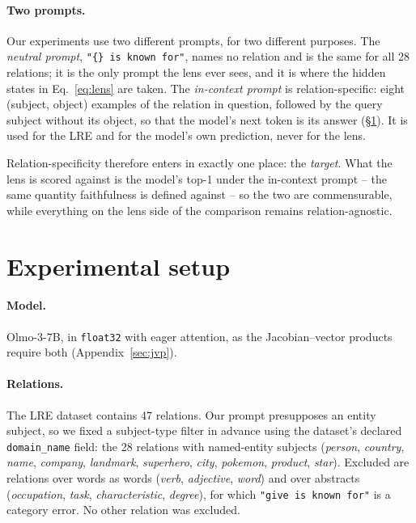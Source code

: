 \documentclass[11pt]{article}
\begin{document}
\paragraph{Two prompts.} Our experiments
use two different prompts, for two different purposes. The
\emph{neutral prompt}, \texttt{"\{\} is known for"}, names no relation and
is the same for all 28 relations; it is the only prompt the lens ever
sees, and it is where the hidden states in Eq.~\ref{eq:lens} are taken.
The \emph{in-context prompt} is relation-specific: eight (subject,
object) examples of the relation in question, followed by the query
subject without its object, so that the model's next token is its answer
(\S\ref{sec:setup}). It is used for the LRE and for the model's own
prediction, never for the lens.

Relation-specificity therefore enters in exactly one place: the
\emph{target}. What the lens is scored against is the model's top-1 under
the in-context prompt -- the same quantity faithfulness is defined
against -- so the two are commensurable, while everything on the lens
side of the comparison remains relation-agnostic.

\section{Experimental setup}
\label{sec:setup}

\paragraph{Model.} Olmo-3-7B, in \texttt{float32} with eager attention,
as the Jacobian--vector products require both
(Appendix~\ref{sec:jvp}).

\paragraph{Relations.} The LRE dataset \citep{hernandez2024linearity}
contains 47 relations. Our prompt presupposes an entity subject, so we
fixed a subject-type filter in advance using the dataset's declared
\texttt{domain\_name} field: the 28 relations with named-entity subjects
(\textit{person}, \textit{country}, \textit{name}, \textit{company},
\textit{landmark}, \textit{superhero}, \textit{city}, \textit{pokemon},
\textit{product}, \textit{star}). Excluded are relations over words as
words (\textit{verb}, \textit{adjective}, \textit{word}) and over abstracts
(\textit{occupation}, \textit{task}, \textit{characteristic},
\textit{degree}), for which \texttt{"give is known for"} is a category
error. No other relation was excluded.
\end{document}
